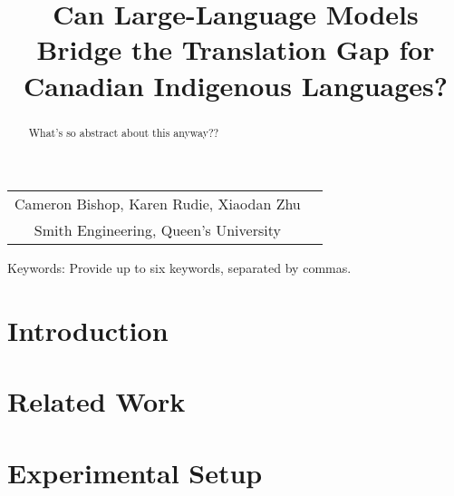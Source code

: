 \documentclass[10pt]{cai}
\begin{document}
\def\conferenceyear{2024}
\begin{center}

\title{Can Large-Language Models Bridge the Translation Gap for Canadian Indigenous Languages?}
\maketitle

\thispagestyle{empty}

\begin{tabular}{cc}
Cameron Bishop\upstairs{\affilone *}, Karen Rudie\upstairs{\affilone}, Xiaodan Zhu\upstairs{\affilone}
\\[0.25ex]
{\small \upstairs{\affilone} Smith Engineering, Queen's University} \\
\end{tabular}
  
\vspace*{0.2in}
\end{center}

\begin{abstract}
What's so abstract about this anyway??
\end{abstract}

\begin{keywords}{Keywords:}
Provide up to six keywords, separated by commas.
\end{keywords}
\copyrightnotice

\section{Introduction}
\label{intro}

\section{Related Work}
\label{related}

\section{Experimental Setup}
\label{exp}
\end{document}
